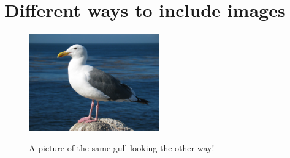 \documentclass[10pt, a4paper]{article}
\begin{document}
\listoffigures
\newpage
\section{Different ways to include images}


\begin{figure}[h]
\centering
  \includegraphics[width=0.5\textwidth]{gull_picture}
\end{figure}

\begin{figure}[h]
  \centering
  \caption{A picture of the same gull
           looking the other way!}
\end{figure}
\newpage

\end{document}
